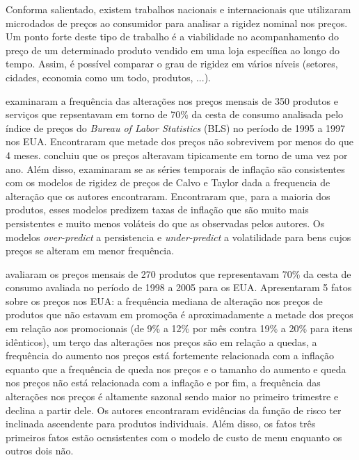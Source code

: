 \documentclass[twoside,a4paper,11pt]{report}
\begin{document}
Conforma salientado, existem trabalhos nacionais e internacionais que utilizaram microdados de preços ao consumidor para analisar a rigidez nominal nos preços. Um ponto forte deste tipo de trabalho é a viabilidade no acompanhamento do preço de um determinado produto vendido em uma loja específica ao longo do tempo. Assim, é possível comparar o grau de rigidez em vários níveis (setores, cidades, economia como um todo, produtos, ...).

\citet{bils2004some} examinaram a frequência das alterações nos preços mensais de 350 produtos e serviços que repsentavam em torno de 70\% da cesta de consumo analisada pelo índice de preços do \emph{Bureau of Labor Statistics} (BLS) no período de 1995 a 1997 nos EUA. Encontraram que metade dos preços não sobrevivem por menos do que 4 meses. \citet{taylor1980aggregate} concluiu que os preços alteravam tipicamente em torno de uma vez por ano. Além disso, examinaram se as séries temporais de inflação são consistentes com os modelos de rigidez de preços de Calvo e Taylor dada a frequencia de alteração que os autores encontraram. Encontraram que, para a maioria dos produtos, esses modelos predizem taxas de inflação que são muito mais persistentes e muito menos voláteis do que as observadas pelos autores. Os modelos \emph{over-predict} a persistencia e \emph{under-predict} a volatilidade para bens cujos preços se alteram em menor frequência.

\citet{nakamura2008five} avaliaram os preços mensais de 270 produtos que representavam 70\% da cesta de consumo avaliada no período de 1998 a 2005 para os EUA. Apresentaram 5 fatos sobre os preços nos EUA: a frequência mediana de alteração nos preços de produtos que não estavam em promoçõa é aproximadamente a metade dos preços em relação aos promocionais (de 9\% a 12\% por mês contra 19\% a 20\% para itens idênticos), um terço das alterações nos preços são em relação a quedas, a frequência do aumento nos  preços está fortemente relacionada com a inflação equanto que a frequência de queda nos preços e o tamanho do aumento e queda nos preços não está relacionada com a inflação e por fim, a frequência das alterações nos preços é altamente sazonal sendo maior no primeiro trimestre e declina a partir dele. Os autores encontraram evidências da função de risco ter inclinada ascendente para produtos individuais. Além disso, os fatos três primeiros fatos estão ocnsistentes com o modelo de custo de menu enquanto os outros dois não.
\end{document}
